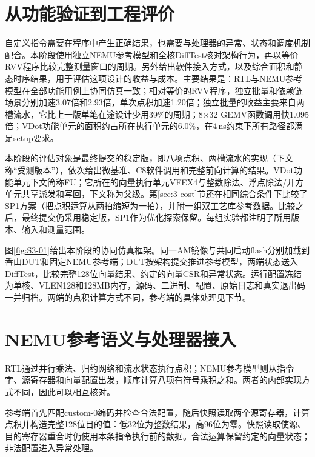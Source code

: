 \renewcommand{\stagefigureprefix}{3}\setcounter{figure}{0}

\section{从功能验证到工程评价}
自定义指令需要在程序中产生正确结果，也需要与处理器的异常、状态和调度机制配合。本阶段使用独立NEMU参考模型和全核DiffTest核对架构行为，再以等价RVV程序比较完整测量窗口的周期。另外给出软件接入方式，以及综合面积和静态时序结果，用于评估这项设计的收益与成本。主要结果是：RTL与NEMU参考模型在全部功能用例上协同仿真一致；相对等价的RVV程序，独立批量和依赖链场景分别加速3.07倍和2.93倍，单次点积加速1.20倍；独立批量的收益主要来自两槽流水，它比上一版单笔在途设计少用39\%的周期；8×32 GEMV函数调用快1.095倍；VDot功能单元的面积约占所在执行单元的6.0\%，在4\,ns约束下所有路径都满足setup要求。

本阶段的评估对象是最终提交的稳定版，即八项点积、两槽流水的实现（下文称“受测版本”），依次给出微基准、C8软件调用和完整前向计算的结果。VDot功能单元下文简称FU；它所在的向量执行单元VFEX4与整数除法、浮点除法/开方单元共享派发和写回，下文称为父级。第\ref{sec:3-cost}节还在相同综合条件下比较了SP1方案（把点积运算从两拍缩短为一拍），并附一组双工艺库参考数据。比较之后，最终提交仍采用稳定版，SP1作为优化探索保留。每组实验都注明了所用版本、输入和测量范围。

图\ref{fig:S3-01}给出本阶段的协同仿真框架。同一AM镜像与共同启动flash分别加载到香山DUT和固定NEMU参考端；DUT按架构提交推进参考模型，两端状态送入DiffTest，比较完整128位向量结果、约定的向量CSR和异常状态。运行配置冻结为单核、VLEN128和128MB内存，源码、二进制、配置、原始日志和真实退出码一并归档。两端的点积计算方式不同，参考端的具体处理见下节。


\section{NEMU参考语义与处理器接入}
RTL通过并行乘法、归约网络和流水状态执行点积；NEMU参考模型则从指令字、源寄存器和向量配置出发，顺序计算八项有符号乘积之和。两者的内部实现方式不同，因此可以相互核对。

参考端首先匹配custom-0编码并检查合法配置，随后快照读取两个源寄存器，计算点积并构造完整128位目的值：低32位为整数结果，高96位为零。快照读取使源、目的寄存器重合时仍使用本条指令执行前的数据。合法运算保留约定的向量状态；非法配置进入异常处理。

